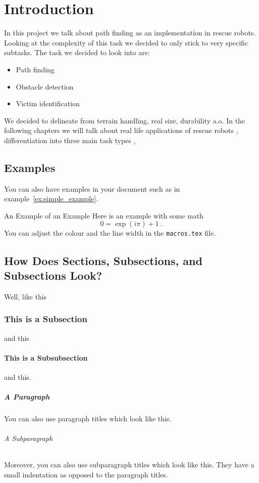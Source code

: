 \chapter{Introduction}\label{ch:introduction}
In this project we talk about path finding as an implementation in rescue robots.
Looking at the complexity of this task we decided to only stick to very specific subtasks.
The task we decided to look into are:
\begin{itemize}
\item Path finding
\item Obstacle detection
\item Victim identification 
\end{itemize}
We decided to delineate from terrain handling, real size, durability a.o. 
In the following chapters we will talk about real life applications of rescue robots ,
differentiation into three main task types  ,

\section{Examples}
You can also have examples in your document such as in example~\ref{ex:simple_example}.
\begin{example}{An Example of an Example}
  \label{ex:simple_example}
  Here is an example with some math
  \begin{equation}
    0 = \exp(i\pi)+1\ .
  \end{equation}
  You can adjust the colour and the line width in the {\tt macros.tex} file.
\end{example}

\section{How Does Sections, Subsections, and Subsections Look?}
Well, like this
\subsection{This is a Subsection}
and this
\subsubsection{This is a Subsubsection}
and this.

\paragraph{A Paragraph}
You can also use paragraph titles which look like this.

\subparagraph{A Subparagraph} Moreover, you can also use subparagraph titles which look like this. They have a small indentation as opposed to the paragraph titles.

